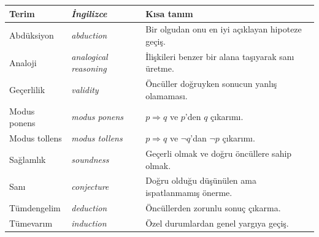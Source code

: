 
{\small
\renewcommand{\arraystretch}{1.25}
\begin{longtable}{>{\raggedright\arraybackslash}p{2.3cm}>{\raggedright\itshape\arraybackslash}p{2.3cm}>{\raggedright\arraybackslash}p{5.6cm}}
\toprule
\textbf{Terim} & \textbf{\upshape İngilizce} & \textbf{Kısa tanım}\\
\midrule\endhead
Abdüksiyon & abduction & Bir olgudan onu en iyi açıklayan hipoteze geçiş.\\
Analoji & analogical reasoning & İlişkileri benzer bir alana taşıyarak sanı üretme.\\
Geçerlilik & validity & Öncüller doğruyken sonucun yanlış olamaması.\\
Modus ponens & modus ponens & $p\Rightarrow q$ ve $p$’den $q$ çıkarımı.\\
Modus tollens & modus tollens & $p\Rightarrow q$ ve $\neg q$’dan $\neg p$ çıkarımı.\\
Sağlamlık & soundness & Geçerli olmak ve doğru öncüllere sahip olmak.\\
Sanı & conjecture & Doğru olduğu düşünülen ama ispatlanmamış önerme.\\
Tümdengelim & deduction & Öncüllerden zorunlu sonuç çıkarma.\\
Tümevarım & induction & Özel durumlardan genel yargıya geçiş.\\
\bottomrule
\end{longtable}
}
